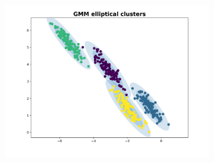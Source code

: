 \documentclass[11pt]{article}
\theoremstyle{definition}
\begin{document}
\begin{figure}[H]
\begin{subfigure}[t]{0.49\linewidth}
	\end{subfigure}
	\hfill
	\begin{subfigure}[t]{0.49\linewidth}
		\includegraphics[width=\linewidth]{img/GMM04}
	\end{subfigure}
\end{figure}
\end{document}
